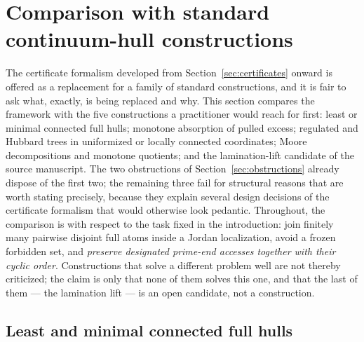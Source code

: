 \documentclass[11pt,reqno]{amsart}
\theoremstyle{definition}
\theoremstyle{remark}
\begin{document}

\section{Comparison with standard continuum-hull constructions}
\label{sec:comparison}

The certificate formalism developed from Section~\ref{sec:certificates}
onward is offered as a replacement for a family of standard constructions,
and it is fair to ask what, exactly, is being replaced and why.  This
section compares the framework with the five constructions a practitioner
would reach for first: least or minimal connected full hulls; monotone
absorption of pulled excess; regulated and Hubbard trees in uniformized or
locally connected coordinates; Moore decompositions and monotone
quotients; and the lamination-lift candidate of the source manuscript.
The two obstructions of Section~\ref{sec:obstructions} already dispose of
the first two; the remaining three fail for structural reasons that are
worth stating precisely, because they explain several design decisions of
the certificate formalism that would otherwise look pedantic.  Throughout,
the comparison is with respect to the task fixed in the introduction:
join finitely many pairwise disjoint full atoms inside a Jordan
localization, avoid a frozen forbidden set, and \emph{preserve designated
prime-end accesses together with their cyclic order}.  Constructions that
solve a different problem well are not thereby criticized; the claim is
only that none of them solves this one, and that the last of them ---
the lamination lift --- is an open candidate, not a construction.

\subsection{Least and minimal connected full hulls}
\label{subsec:A-comp-least}
\end{document}
